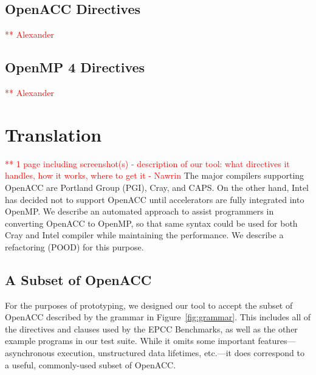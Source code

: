 \documentclass{sig-alternate-05-2015}
\newcommand\todo[1]{\textcolor{red}{** #1}}
\begin{document}
\subsection{OpenACC Directives}
\todo{Alexander}
\subsection{OpenMP 4 Directives}
\todo{Alexander}

\section{Translation}
\todo{1 page including screenshot(s) - description of our tool: what directives it handles, how it works, where to get it - Nawrin}
The major compilers supporting OpenACC are Portland Group (PGI), Cray, and CAPS. On the other hand, Intel has decided not to support OpenACC until accelerators are fully integrated into OpenMP. We describe an automated approach to assist programmers in converting OpenACC to OpenMP, so that same syntax could be used for both Cray and Intel compiler while maintaining the performance. We describe a refactoring (POOD) for this purpose.

\subsection{A Subset of OpenACC}
For the purposes of prototyping, we designed our tool to accept the subset of
OpenACC described by the grammar in Figure~\ref{fig:grammar}.  This includes
all of the directives and clauses used by the EPCC Benchmarks, as well as the
other example programs in our test suite.  While it omits some important
features---asynchronous execution, unstructured data lifetimes, etc.---it does
correspond to a useful, commonly-used subset of OpenACC.
\end{document}
